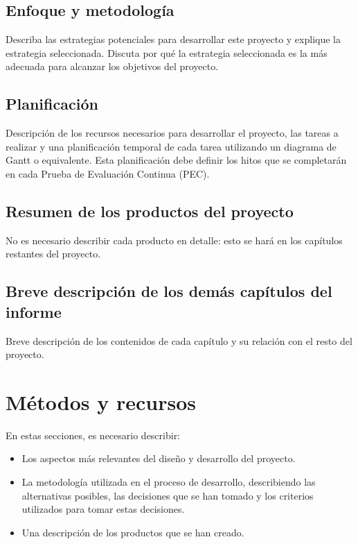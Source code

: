 \documentclass[12pt,a4paper,twoside]{book}
\begin{document}
\subsection{Enfoque y metodología}

Describa las estrategias potenciales para desarrollar este proyecto y explique la estrategia seleccionada. Discuta por qué la estrategia seleccionada es la más adecuada para alcanzar los objetivos del proyecto.

\subsection{Planificación}

Descripción de los recursos necesarios para desarrollar el proyecto, las tareas a realizar y una planificación temporal de cada tarea utilizando un diagrama de Gantt o equivalente. Esta planificación debe definir los hitos que se completarán en cada Prueba de Evaluación Continua (PEC).

\subsection{Resumen de los productos del proyecto}

No es necesario describir cada producto en detalle: esto se hará en los capítulos restantes del proyecto.

\subsection{Breve descripción de los demás capítulos del informe}

Breve descripción de los contenidos de cada capítulo y su relación con el resto del proyecto.

\section{Métodos y recursos}

En estas secciones, es necesario describir:

\begin{itemize}
    \item Los aspectos más relevantes del diseño y desarrollo del proyecto.
    \item La metodología utilizada en el proceso de desarrollo, describiendo las alternativas posibles, las decisiones que se han tomado y los criterios utilizados para tomar estas decisiones.
    \item Una descripción de los productos que se han creado.
\end{itemize}
\end{document}
